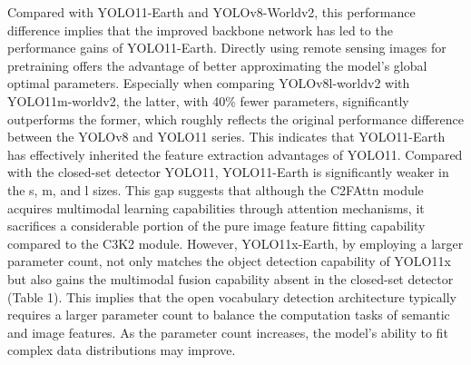 \documentclass{article}
\begin{document}
Compared with YOLO11-Earth and YOLOv8-Worldv2, this performance difference implies that the improved backbone 
network has led to the performance gains of YOLO11-Earth. Directly using remote sensing images for pretraining 
offers the advantage of better approximating the model's global optimal parameters. Especially when comparing 
YOLOv8l-worldv2 with YOLO11m-worldv2, the latter, with 40\% fewer parameters, significantly outperforms the former, 
which roughly reflects the original performance difference between the YOLOv8 and YOLO11 series. This indicates 
that YOLO11-Earth has effectively inherited the feature extraction advantages of YOLO11. Compared with the 
closed-set detector YOLO11, YOLO11-Earth is significantly weaker in the s, m, and l sizes. This gap suggests 
that although the C2FAttn module acquires multimodal learning capabilities through attention mechanisms, 
it sacrifices a considerable portion of the pure image feature fitting capability compared to the C3K2 module. 
However, YOLO11x-Earth, by employing a larger parameter count, not only matches the object detection capability 
of YOLO11x but also gains the multimodal fusion capability absent in the closed-set detector (Table 1). This 
implies that the open vocabulary detection architecture typically requires a larger parameter count to balance 
the computation tasks of semantic and image features. As the parameter count increases, the model's ability to fit 
complex data distributions may improve.
\end{document}
